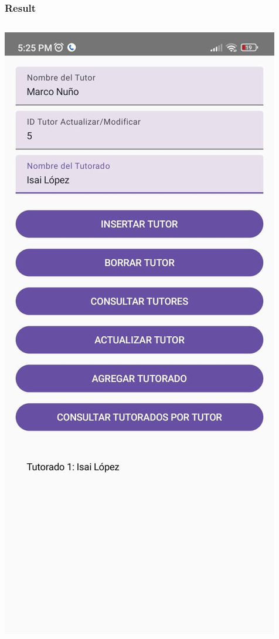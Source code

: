 \documentclass[pdf,
serif,
compress,
xcolor=table,
dvipsnames,
spanish,
aspectratio=169]{beamer}
\begin{document}
\begin{frame}
    \frametitle{Result}

    \begin{columns}

        \begin{center}
            \includegraphics[width=0.7\linewidth]{graphics/ConsultarTutorados.jpeg} %
        \end{center}

    \end{columns}
\end{frame}
\end{document}
